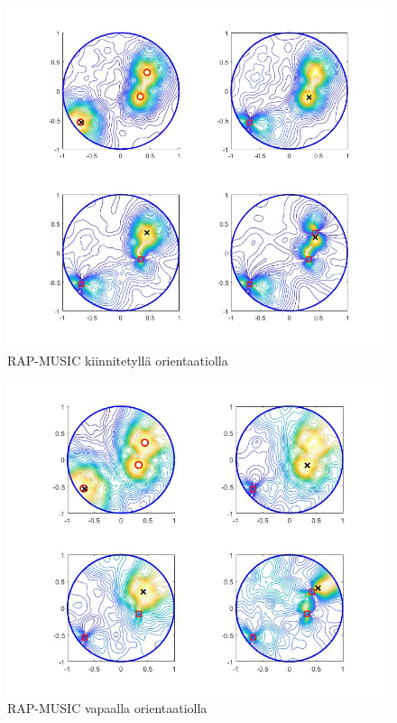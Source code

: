 \clearpage

\begin{figure}[ht]
    \centering
    \includegraphics[width=\textwidth]{RAPfixed.jpg}
    \caption{RAP-MUSIC kiinnitetyllä orientaatiolla}
    \label{fig:RAPfix}
\end{figure}

\clearpage
\begin{figure}[ht]
    \centering
    \includegraphics[width=\textwidth]{RAPfree.jpg}
    \caption{RAP-MUSIC vapaalla orientaatiolla}
    \label{fig:RAPfree}
\end{figure}